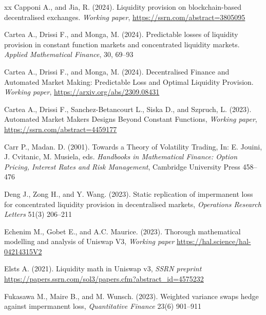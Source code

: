 \documentclass[pdftex,11pt,a4paper] {article}
\begin{document}
\begin{thebibliography}{xx}
 Capponi A., and
Jia, R. (2024). Liquidity provision on blockchain-based decentralised
exchanges. \emph{Working paper}, \url{https://ssrn.com/abstract=3805095}

 Cartea A., Drissi
F., and Monga, M. (2024). Predictable losses of liquidity provision in
constant function markets and concentrated liquidity markets. \emph{Applied
Mathematical Finance}, 30, 69--93

 Cartea A., Drissi
F., and Monga, M. (2024). Decentralised Finance and Automated Market Making:
Predictable Loss and Optimal Liquidity Provision. \emph{Working paper}, %
\url{https://arxiv.org/abs/2309.08431}

 Cartea A., Drissi
F., Sanchez-Betancourt L., Siska D., and Szpruch, L. (2023). Automated Market Makers Designs Beyond Constant Functions, \emph{Working paper}, %
\url{https://ssrn.com/abstract=4459177}


 Carr P., Madan. D.
(2001). Towards a Theory of Volatility Trading, In: E. Jouini, J. Cvitanic,
M. Musiela, eds. \emph{Handbooks in Mathematical Finance: Option Pricing,
Interest Rates and Risk Management}, Cambridge University Press 458--476


 Deng J., Zong H., and
Y. Wang. (2023). Static replication of impermanent loss for concentrated
liquidity provision in decentralised markets, \emph{Operations Research
Letters} 51(3) 206--211

 Echenim M.,
Gobet E., and A.C. Maurice. (2023). Thorough mathematical modelling and
analysis of Uniswap V3, \emph{Working paper} %
\url{https://hal.science/hal-04214315V2}

 Elsts A. (2021). Liquidity math in Uniswap v3, \emph{SSRN preprint} %
\url{https://papers.ssrn.com/sol3/papers.cfm?abstract_id=4575232}

 Fukasawa M.,
Maire B., and M. Wunsch. (2023). Weighted variance swaps hedge against
impermanent loss, \emph{Quantitative Finance} 23(6) 901--911


\end{thebibliography}
\end{document}
